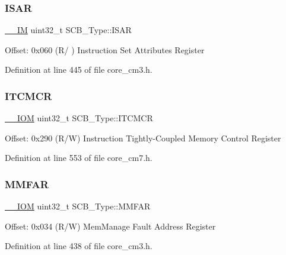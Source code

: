 \subsubsection{\texorpdfstring{I\+S\+AR}{ISAR}}
{\footnotesize\ttfamily \hyperlink{core__sc300_8h_a4cc1649793116d7c2d8afce7a4ffce43}{\+\_\+\+\_\+\+IM} uint32\+\_\+t S\+C\+B\+\_\+\+Type\+::\+I\+S\+AR}

Offset\+: 0x060 (R/ ) Instruction Set Attributes Register 

Definition at line 445 of file core\+\_\+cm3.\+h.

\mbox{\label{struct_s_c_b___type_aba8abbd3db06a07b50f56547501983f9}} 
\subsubsection{\texorpdfstring{I\+T\+C\+M\+CR}{ITCMCR}}
{\footnotesize\ttfamily \hyperlink{core__sc300_8h_ab6caba5853a60a17e8e04499b52bf691}{\+\_\+\+\_\+\+I\+OM} uint32\+\_\+t S\+C\+B\+\_\+\+Type\+::\+I\+T\+C\+M\+CR}

Offset\+: 0x290 (R/W) Instruction Tightly-\/\+Coupled Memory Control Register 

Definition at line 553 of file core\+\_\+cm7.\+h.

\mbox{\label{struct_s_c_b___type_a2d03d0b7cec2254f39eb1c46c7445e80}} 
\subsubsection{\texorpdfstring{M\+M\+F\+AR}{MMFAR}}
{\footnotesize\ttfamily \hyperlink{core__sc300_8h_ab6caba5853a60a17e8e04499b52bf691}{\+\_\+\+\_\+\+I\+OM} uint32\+\_\+t S\+C\+B\+\_\+\+Type\+::\+M\+M\+F\+AR}

Offset\+: 0x034 (R/W) Mem\+Manage Fault Address Register 

Definition at line 438 of file core\+\_\+cm3.\+h.

\mbox{\label{struct_s_c_b___type_a4f353f207bb27a1cea7861aa9eb00dbb}} 
